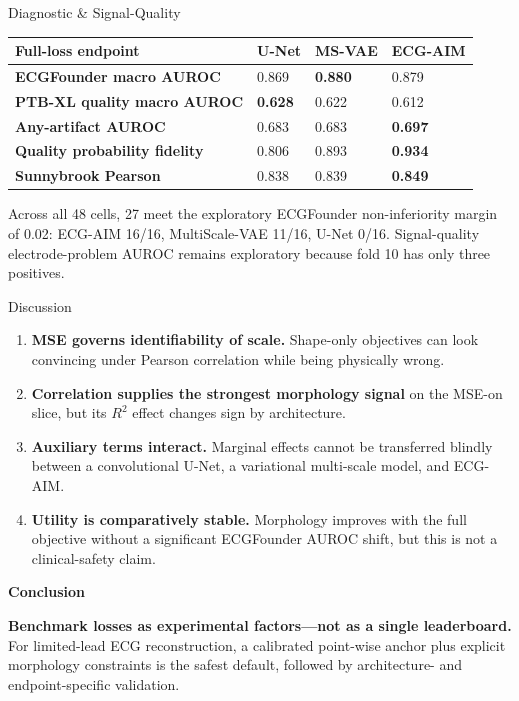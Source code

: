\documentclass[final]{beamer}
\newcommand{\BodyFont}{\fontsize{25}{30}\selectfont}
\newcommand{\SmallFont}{\fontsize{21}{25}\selectfont}
\newcommand{\HeadingFont}{\fontsize{40}{44}\selectfont\bfseries}
\begin{document}
\begin{frame}[t]
\begin{columns}[T,totalwidth=\textwidth]
\begin{column}{0.31\textwidth}
\begin{PosterBox}{Diagnostic \& Signal-Quality}
\SmallFont
\begin{tabularx}{\linewidth}{>{\bfseries}Y C{31mm} C{31mm} C{31mm}}
\toprule
Full-loss endpoint & U-Net & MS-VAE & ECG-AIM\\
\midrule
ECGFounder macro AUROC & 0.869 & \textbf{0.880} & 0.879\\
PTB-XL quality macro AUROC & \textbf{0.628} & 0.622 & 0.612\\
Any-artifact AUROC & 0.683 & 0.683 & \textbf{0.697}\\
Quality probability fidelity & 0.806 & 0.893 & \textbf{0.934}\\
Sunnybrook Pearson & 0.838 & 0.839 & \textbf{0.849}\\
\bottomrule
\end{tabularx}
\vspace{3mm}
\BodyFont
Across all 48 cells, 27 meet the exploratory ECGFounder non-inferiority margin
of 0.02: ECG-AIM 16/16, MultiScale-VAE 11/16, U-Net 0/16. Signal-quality
electrode-problem AUROC remains exploratory because fold 10 has only three
positives.
\end{PosterBox}

\begin{PosterBox}{Discussion}
\BodyFont
\begin{enumerate}
  \setlength{\itemsep}{3mm}
  \item \textbf{MSE governs identifiability of scale.} Shape-only objectives
        can look convincing under Pearson correlation while being physically wrong.
  \item \textbf{Correlation supplies the strongest morphology signal} on the
        MSE-on slice, but its \(R^2\) effect changes sign by architecture.
  \item \textbf{Auxiliary terms interact.} Marginal effects cannot be
        transferred blindly between a convolutional U-Net, a variational
        multi-scale model, and ECG-AIM.
  \item \textbf{Utility is comparatively stable.} Morphology improves with
        the full objective without a significant ECGFounder AUROC shift, but
        this is not a clinical-safety claim.
\end{enumerate}
\end{PosterBox}

\begin{TealBox}
\HeadingFont\color{DeepNavy}Conclusion\par
\BodyFont
\textbf{Benchmark losses as experimental factors—not as a single leaderboard.}
For limited-lead ECG reconstruction, a calibrated point-wise anchor plus
explicit morphology constraints is the safest default, followed by
architecture- and endpoint-specific validation.
\end{TealBox}


\end{column}
\end{columns}
\end{frame}
\end{document}
